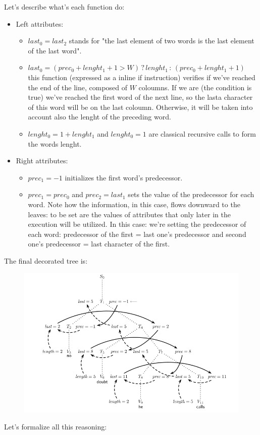 				Let's describe what's each function do:
				\begin{itemize}
					\item Left attributes:
					\begin{itemize}
						\item $last_0 = last_2$ stands for "the last element of two words is the last element of the last word".
						\item $last_0 = (prec_0 + lenght_1 + 1 > W) \,?\, lenght_1 \,:\, (prec_0 + lenght_1 + 1)$ this function (expressed as a inline if instruction) verifies if we've reached the end of the line, composed of $W$ coloumns. If we are (the condition is true) we've reached the first word of the next line, so the lasta character of this word will be on the last coloumn. Otherwise, it will be taken into account also the lenght of the preceding word.
						\item  $lenght_0 = 1 + lenght_1$ and $lenght_0 = 1$ are classical recursive calls to form the words lenght.
					\end{itemize}
					\item Right attributes:
						\begin{itemize}
							\item $prec_1 = -1$ initializes the first word's predecessor.
							\item $prec_1 = prec_0$ and $prec_2 = last_1$ sets the value of the predecessor for each word. Note how the information, in this case, flows downward to the leaves: to be set are the values of attributes that only later in the execution will be utilized. In this case: we're setting the predecessor of each word: predecessor of the first = last one's predecessor and second one's predecessor = last character of the first.
						\end{itemize}
				\end{itemize}
				The final decorated tree is:
				\begin{figure}[H]
					\includegraphics[width = \textwidth]{./images/decTree.png}
				\end{figure}
				Let's formalize all this reasoning:
			

